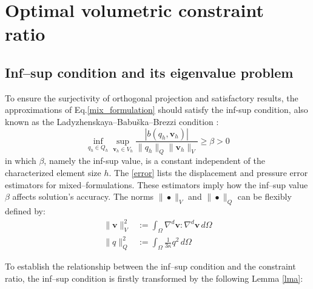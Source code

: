 \section{Optimal volumetric constraint ratio}\label{sec:constraint_ratio}
\subsection{Inf--sup condition and its eigenvalue problem}

To ensure the surjectivity of orthogonal projection and satisfactory results, the approximations of Eq.\eqref{mix_formulation} should satisfy the inf-sup condition, also known as the Ladyzhenskaya--Babuška--Brezzi condition \cite{bathe1996}:
\begin{equation}\label{infsup}
\inf_{q_h \in Q_h} \sup_{\boldsymbol{v}_h \in V_h} \frac{|b(q_h, \boldsymbol{v}_h)|}{\|q_h\|_Q \|\boldsymbol{v}_h\|_V} \ge \beta > 0
\end{equation}
in which $\beta$, namely the inf-sup value, is a constant independent of the characterized element size $h$.
The \ref{error} lists the displacement and pressure error estimators for mixed--formulations.
These estimators imply how the inf--sup value $\beta$ affects solution's accuracy.
The norms $\|\bullet\|_V$ and $\|\bullet\|_Q$ can be flexibly defined by:
\begin{align}
\label{norm_V}
\|\boldsymbol{v}\|_V^2 &:= \int_\Omega \nabla^d \boldsymbol{v} : \nabla^d \boldsymbol{v} \, d\Omega \\
\label{norm_Q}
\|q\|_Q^2 &:= \int_\Omega \frac{1}{3\kappa} q^2 \, d\Omega
\end{align}

To establish the relationship between the inf--sup condition and the constraint ratio, the inf--sup condition is firstly transformed by the following Lemma \ref{lma}:

